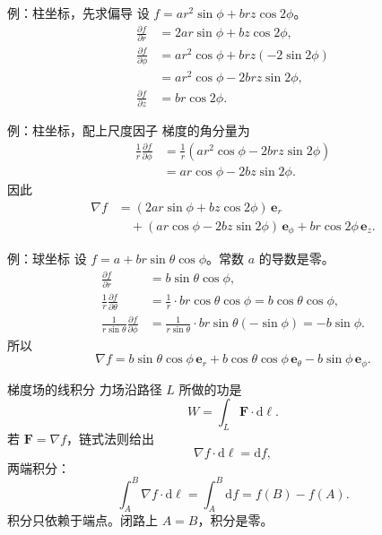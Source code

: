 \documentclass[fontset=windows, chinese, 10pt, xcolor=dvipsnames]{beamer}
\begin{document}
\begin{frame}{例：柱坐标，先求偏导}
  设 $f=ar^2\sin\phi+brz\cos 2\phi$。
  \begin{align*}
    \frac{\partial f}{\partial r}
    &= 2ar\sin\phi+bz\cos 2\phi,\\
    \frac{\partial f}{\partial\phi}
    &= ar^2\cos\phi+brz(-2\sin 2\phi) \\
    &= ar^2\cos\phi-2brz\sin 2\phi,\\
    \frac{\partial f}{\partial z}
    &= br\cos 2\phi.
  \end{align*}
\end{frame}

\begin{frame}{例：柱坐标，配上尺度因子}
  梯度的角分量为
  \begin{align*}
    \frac{1}{r}\frac{\partial f}{\partial\phi}
    &= \frac{1}{r}(ar^2\cos\phi-2brz\sin 2\phi) \\
    &= ar\cos\phi-2bz\sin 2\phi.
  \end{align*}
  因此
  \begin{align*}
    \nabla f
    &= (2ar\sin\phi+bz\cos 2\phi)\,\mathbf{e}_r \\
    &\quad +(ar\cos\phi-2bz\sin 2\phi)\,\mathbf{e}_\phi
     + br\cos 2\phi\,\mathbf{e}_z.
  \end{align*}
\end{frame}

\begin{frame}{例：球坐标}
  设 $f=a+br\sin\theta\cos\phi$。常数 $a$ 的导数是零。
  \begin{align*}
    \frac{\partial f}{\partial r}
    &= b\sin\theta\cos\phi,\\
    \frac{1}{r}\frac{\partial f}{\partial\theta}
    &= \frac{1}{r}\cdot br\cos\theta\cos\phi
     = b\cos\theta\cos\phi,\\
    \frac{1}{r\sin\theta}\frac{\partial f}{\partial\phi}
    &= \frac{1}{r\sin\theta}\cdot br\sin\theta(-\sin\phi)
     = -b\sin\phi.
  \end{align*}
  所以
  \begin{equation*}
    \nabla f
    = b\sin\theta\cos\phi\,\mathbf{e}_r
    + b\cos\theta\cos\phi\,\mathbf{e}_\theta
    - b\sin\phi\,\mathbf{e}_\phi.
  \end{equation*}
\end{frame}

\begin{frame}{梯度场的线积分}
  力场沿路径 $L$ 所做的功是
  \begin{equation*}
    W=\int_L\mathbf{F}\cdot\mathrm{d}\boldsymbol{\ell}.
  \end{equation*}
  若 $\mathbf{F}=\nabla f$，链式法则给出
  \begin{equation*}
    \nabla f\cdot\mathrm{d}\boldsymbol{\ell}
    = \mathrm{d}f,
  \end{equation*}
  两端积分：
  \begin{equation*}
    \int_A^B\nabla f\cdot\mathrm{d}\boldsymbol{\ell}
    = \int_A^B\mathrm{d}f
    = f(B)-f(A).
  \end{equation*}
  积分只依赖于端点。闭路上 $A=B$，积分是零。
\end{frame}
\end{document}
